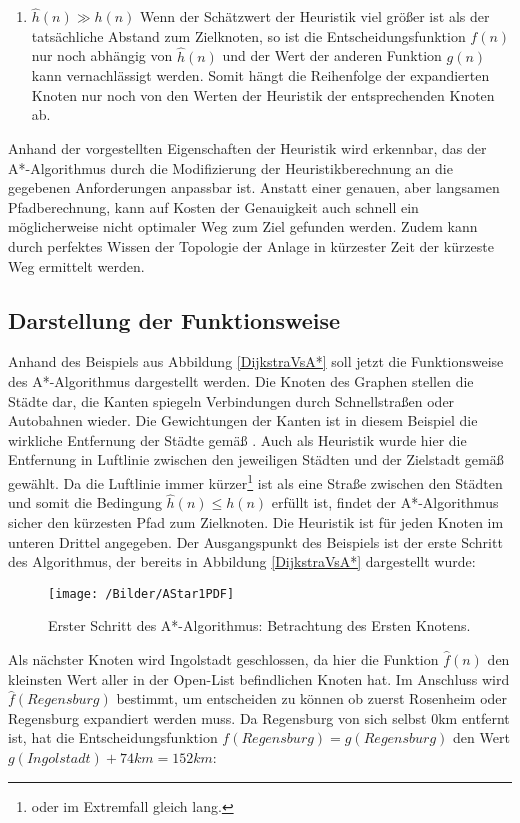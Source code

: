 \begin{enumerate}
			\item \textbf{$\hat{h}(n)\gg h(n)$} Wenn der Schätzwert der Heuristik viel größer ist als der tatsächliche Abstand zum Zielknoten, so ist die Entscheidungsfunktion $f(n)$ nur noch abhängig von $\hat{h}(n)$ und der Wert der anderen Funktion $g(n)$ kann vernachlässigt werden. Somit hängt die Reihenfolge der expandierten Knoten nur noch von den Werten der Heuristik der entsprechenden Knoten ab.
		\end{enumerate}
		 
		Anhand der vorgestellten Eigenschaften der Heuristik wird erkennbar, das der A*-Algorithmus durch die Modifizierung der Heuristikberechnung an die gegebenen Anforderungen anpassbar ist. Anstatt einer genauen, aber langsamen Pfadberechnung, kann auf Kosten der Genauigkeit auch schnell ein möglicherweise nicht optimaler Weg zum Ziel gefunden werden. Zudem kann durch perfektes Wissen der Topologie der Anlage in kürzester Zeit der kürzeste Weg ermittelt werden.
	
	\subsection{Darstellung der Funktionsweise}
		Anhand des Beispiels aus Abbildung \ref{DijkstraVsA*} soll jetzt die Funktionsweise des A*-Algorithmus dargestellt werden. Die Knoten des Graphen stellen die Städte dar, die Kanten spiegeln Verbindungen  durch Schnellstraßen oder Autobahnen wieder. Die Gewichtungen der Kanten ist in diesem Beispiel die wirkliche Entfernung der Städte gemäß \cite{Luftlinie}. Auch als Heuristik wurde hier die Entfernung in Luftlinie zwischen den jeweiligen Städten und der Zielstadt gemäß \cite{Luftlinie} gewählt. Da die Luftlinie immer kürzer\footnote{oder im Extremfall gleich lang.} ist als eine Straße zwischen den Städten und somit die Bedingung $\hat{h}(n)\le h(n)$ erfüllt ist, findet der A*-Algorithmus sicher den kürzesten Pfad zum Zielknoten. Die Heuristik ist für jeden Knoten im unteren Drittel  angegeben. Der Ausgangspunkt des Beispiels ist der erste Schritt des Algorithmus, der bereits in Abbildung \ref{DijkstraVsA*} dargestellt wurde:  
		
		\begin{figure}[H]
			\centering
			\texttt{[image: /Bilder/AStar1PDF]}
			\vspace{0.2cm}
			\caption{Erster Schritt des A*-Algorithmus: Betrachtung des Ersten Knotens.}
		\end{figure}
		
		Als nächster Knoten wird Ingolstadt geschlossen, da hier die Funktion $\hat{f}(n)$ den kleinsten Wert aller in der Open-List befindlichen Knoten hat. Im Anschluss wird $\hat{f}(Regensburg)$ bestimmt, um entscheiden zu können ob zuerst Rosenheim oder Regensburg expandiert werden muss. Da Regensburg von sich selbst 0km entfernt ist, hat die Entscheidungsfunktion $f(Regensburg)=g(Regensburg)$ den Wert $g(Ingolstadt)+74km=152km$:
		
